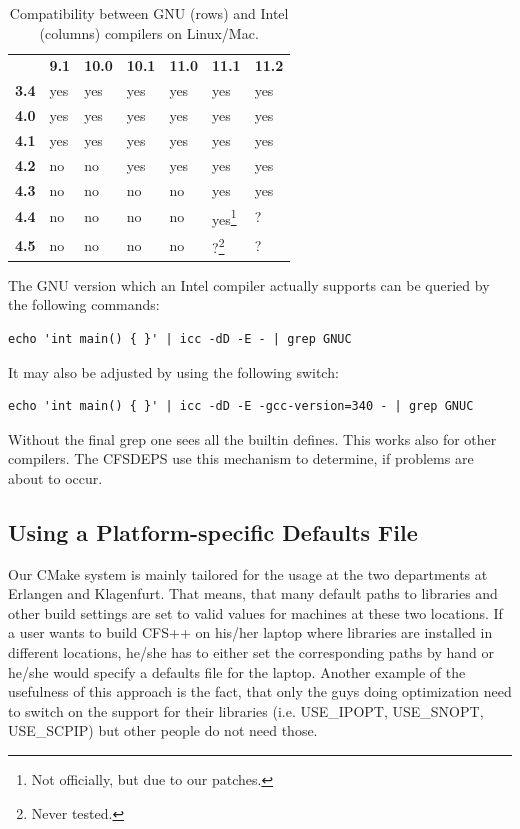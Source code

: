 \begin{table}[htb]
\centering
\begin{minipage}{18cc}\caption{Compatibility  between  GNU  (rows)  and  Intel
(columns) compilers on Linux/Mac.}
\label{tab:compiler_compat_gnu_intel}
\end{minipage}
\par\medskip\noindent
\begin{minipage}{18cc}
\centering
\begin{tabular}{lllllll}
  \toprule
            & {\bf 9.1} & {\bf 10.0} & {\bf 10.1} & {\bf 11.0} & {\bf 11.1} & {\bf 11.2}\\ \otoprule
  {\bf 3.4} & yes & yes & yes & yes & yes & yes \\
  {\bf 4.0} & yes & yes & yes & yes & yes & yes  \\
  {\bf 4.1} & yes & yes & yes & yes & yes & yes  \\
  {\bf 4.2} & no & no & yes & yes & yes & yes  \\
  {\bf 4.3} & no & no & no & no & yes & yes  \\
  {\bf 4.4} & no & no & no & no & yes\footnote{Not officially, but due to our patches.} & ? \\
  {\bf 4.5} & no & no & no & no & ?\footnote{Never tested.} & ? \\
  \bottomrule
\end{tabular} 
\end{minipage}
\end{table}

\noindent The  GNU version  which an Intel  compiler actually supports  can be
queried by the following commands:
\begin{verbatim}
echo 'int main() { }' | icc -dD -E - | grep GNUC
\end{verbatim}

\noindent It may also be adjusted by using the following switch:
\begin{verbatim}
echo 'int main() { }' | icc -dD -E -gcc-version=340 - | grep GNUC
\end{verbatim}

\noindent Without the final grep one  sees all the builtin defines. This works
also  for other compilers.  The CFSDEPS  use this  mechanism to  determine, if
problems are about to occur.

\subsection{Using  a Platform-specific Defaults  File}  Our CMake  system is  mainly
tailored for the usage at the two departments at Erlangen and Klagenfurt. That
means, that many  default paths to libraries and other  build settings are set
to valid values for machines at these two locations.  If a user wants to build
CFS++ on his/her laptop where  libraries are installed in different locations,
he/she  has to  either set  the corresponding  paths by  hand or  he/she would
specify a defaults file for the  laptop.  Another example of the usefulness of
this  approach is  the fact,  that only  the guys  doing optimization  need to
switch  on the  support  for their  libraries  (i.e.  USE\_IPOPT,  USE\_SNOPT,
USE\_SCPIP) but other people do not need those.

